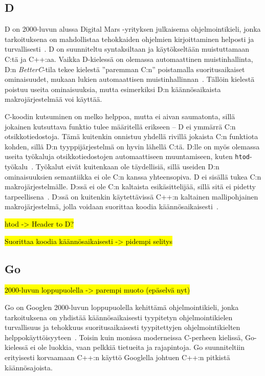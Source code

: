 \subsection{D}

D on 2000-luvun alussa Digital Mars -yrityksen julkaisema ohjelmointikieli,
jonka tarkoituksena on mahdollistaa tehokkaiden ohjelmien kirjoittaminen
helposti ja turvallisesti~\citep{dhistory}. D on suunniteltu syntaksiltaan ja
käytökseltään muistuttamaan C:tä ja C++:aa. Vaikka D-kielessä on olemassa
automaattinen muistinhallinta, D:n \emph{BetterC}-tila tekee kielestä
''paremman C:n'' poistamalla suoritusaikaiset ominaisuudet, mukaan lukien
automaattisen muistinhallinnan~\citep{dbetterc}. Tällöin kielestä poistuu
useita ominaisuuksia, mutta esimerkiksi D:n käännösaikaista makrojärjestelmää
voi käyttää.

C-koodin kutsuminen on melko helppoa, mutta ei aivan saumatonta, sillä jokainen
kutsuttava funktio tulee määritellä erikseen -- D ei ymmärrä C:n
otsikkotiedostoja. Tämä kuitenkin onnistuu yhdellä rivillä jokaista C:n
funktiota kohden, sillä D:n tyyppijärjestelmä on hyvin lähellä C:tä. D:lle on
myös olemassa useita työkaluja otsikkotiedostojen automaattiseen muuntamiseen,
kuten \texttt{htod}-työkalu~\citep{htod}. Työkalut eivät kuitenkaan ole
täydellisiä, sillä useiden D:n ominaisuuksien semantiikka ei ole C:n kanssa
yhteensopiva. D ei sisällä tukea C:n makrojärjestelmälle. D:ssä ei ole C:n
kaltaista esikäsittelijää, sillä sitä ei pidetty tarpeellisena~\citep{pretod}.
D:ssä on kuitenkin käytettävissä C++:n kaltainen mallipohjainen
makrojärjestelmä, jolla voidaan suorittaa koodia
käännösaikaisesti~\citep{Dtemplate}.

\hl{htod -> Header to D?}

\hl{Suorittaa koodia käännösaikaisesti -> pidempi selitys}

\subsection{Go}

\hl{2000-luvun loppupuolella -> parempi muoto (epäselvä nyt)}

Go on Googlen 2000-luvun loppupuolella kehittämä ohjelmointikieli, jonka
tarkoituksena on yhdistää käännösaikaisesti tyypitetyn ohjelmointikielen
turvallisuus ja tehokkuus suoritusaikaisesti tyypitettyjen ohjelmointikielten
helppokäyttöisyyteen~\citep{gohistory}. Toisin kuin monissa moderneissa
C-perheen kielissä, Go-kielessä ei ole luokkia, vaan pelkkiä tietueita ja
rajapintoja. Go suunniteltiin erityisesti korvaamaan C++:n käyttö Googlella
johtuen C++:n pitkistä käännösajoista.

